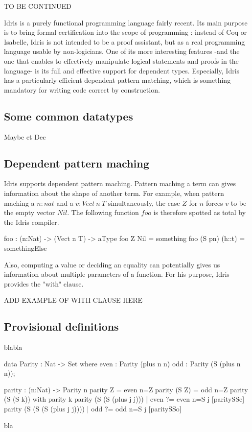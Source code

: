 TO BE CONTINUED

Idris is a purely functional programming language fairly recent. Its main purpose is to bring formal certification into the scope of programming : instead of Coq or Isabelle, Idris is not intended to be a proof assistant, but as a real programming language usable by non-logicians. One of its more interesting features -and the one that enables to effectively manipulate logical statements and proofs in the language- is its full and effective support for dependent types. Especially, Idris has a particularly efficient dependent pattern matching, which is something mandatory for writing code correct by construction.

\subsection{Some common datatypes}

Maybe et Dec

\subsection{Dependent pattern maching}

Idris supports dependent pattern maching. Pattern maching a term can gives information about the shape of another term. For example, when pattern maching a $n:nat$ and a $v:Vect\ n\ T$ simultaneously, the case $Z$ for $n$ forces $v$ to be the empty vector $Nil$.
The following function $foo$ is therefore spotted as total by the Idris compiler.

\begin{code}[caption=A function known to be total thanks to dependent pattern maching, captionpos=b, label=lst1:haskell2]
foo : (n:Nat) -> (Vect n T) -> aType
foo Z Nil = something
foo (S pn) (h::t) = somethingElse
\end{code}


Also, computing a value or deciding an equality can potentially gives us information about multiple parameters of a function. For his purpose, Idris provides the "with" clause.

ADD EXAMPLE OF WITH CLAUSE HERE

\subsection{Provisional definitions}

blabla

\begin{code}[caption=Using decidable equality to infer the shape of parameters, captionpos=b, label=lst1:haskell2]
data Parity : Nat -> Set where
    even : Parity (plus n n)
    odd  : Parity (S (plus n n));

parity : (n:Nat) -> Parity n
parity Z = even {n=Z}
parity (S Z) = odd {n=Z}
parity (S (S k)) with parity k {
  parity (S (S (plus j j)))     
        | even ?= even {n=S j}  [paritySSe]
  parity (S (S (S (plus j j)))) 
        | odd  ?= odd {n=S j}   [paritySSo]
}
\end{code}

bla